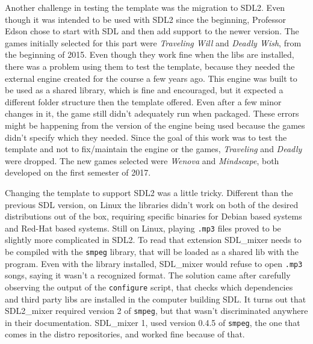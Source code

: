 


Another challenge in testing the template was the migration to SDL2. Even though it was intended to be used with SDL2 since the beginning, Professor Edson chose to start with SDL and then add support to the newer version. The games initially selected for this part were \textit{Traveling Will} and \textit{Deadly Wish}, from the beginning of 2015. Even though they work fine when the libs are installed, there was a problem using them to test the template, because they needed the external engine created for the course a few years ago. This engine was built to be used as a shared library, which is fine and encouraged, but it expected a different folder structure then the template offered. Even after a few minor changes in it, the game still didn't adequately run when packaged. These errors might be happening from the version of the engine being used because the games didn't specify which they needed. Since the goal of this work was to test the template and not to fix/maintain the engine or the games, \textit{Traveling} and \textit{Deadly} were dropped. The new games selected were \textit{Wenova} and \textit{Mindscape}, both developed on the first semester of 2017.

Changing the template to support SDL2 was a little tricky. Different than the previous SDL version, on Linux the libraries didn't work on both of the desired distributions out of the box, requiring specific binaries for Debian based systems and Red-Hat based systems. Still on Linux, playing \texttt{.mp3} files proved to be slightly more complicated in SDL2. To read that extension SDL\_mixer needs to be compiled with the \texttt{smpeg} library, that will be loaded as a shared lib with the program. Even with the library installed, SDL\_mixer would refuse to open \texttt{.mp3} songs, saying it wasn't a recognized format. The solution came after carefully observing the output of the \texttt{configure} script, that checks which dependencies and third party libs are installed in the computer building SDL. It turns out that SDL2\_mixer required version 2 of \texttt{smpeg}, but that wasn't discriminated anywhere in their documentation. SDL\_mixer 1, used version 0.4.5 of \texttt{smpeg}, the one that comes in the distro repositories, and worked fine because of that.

